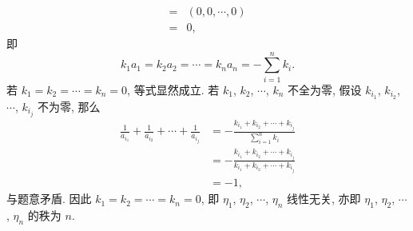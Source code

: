 \documentclass[a4paper, 11pt]{ctexart}
\begin{document}
\begin{enumerate}
\begin{align*}
                ={} & (0, 0, \cdots, 0) \\
                ={} & 0,
            \end{align*}
            即
            \[
                k_1a_1 = k_2a_2 = \cdots = k_na_n = -\sum_{i=1}^nk_i.    
            \]
            若 $k_1 = k_2 = \cdots = k_n = 0$, 等式显然成立. 若 $k_1$, $k_2$, $\cdots$, $k_n$ 不全为零, 假设 $k_{i_1}$, $k_{i_2}$, $\cdots$, $k_{i_j}$ 不为零, 那么
            \begin{align*}
                \frac{1}{a_{i_1}} + \frac{1}{a_{i_2}} + \cdots + \frac{1}{a_{i_j}} &= -\frac{k_{i_1} + k_{i_2} + \cdots + k_{i_j}}{\displaystyle{\sum_{i=1}^nk_i}} \\
                                                                                   &= -\frac{k_{i_1} + k_{i_2} + \cdots + k_{i_j}}{k_{i_1} + k_{i_2} + \cdots + k_{i_j}} \\
                                                                                   &= -1,
            \end{align*}
            与题意矛盾. 因此 $k_1 = k_2 = \cdots = k_n = 0$, 即 $\eta_1$, $\eta_2$, $\cdots$, $\eta_n$ 线性无关, 亦即 $\eta_1$, $\eta_2$, $\cdots$, $\eta_n$ 的秩为 $n$.
    \end{enumerate}
\end{document}
